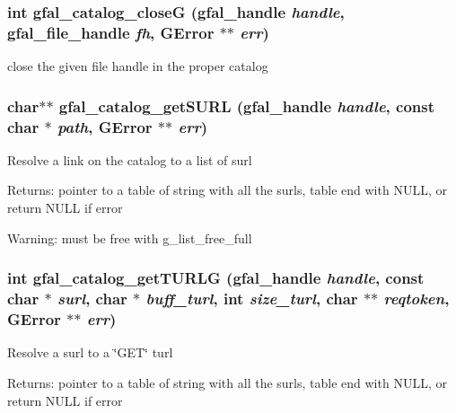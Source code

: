 \subsubsection{\setlength{\rightskip}{0pt plus 5cm}int gfal\_\-catalog\_\-close\-G (gfal\_\-handle {\em handle}, gfal\_\-file\_\-handle {\em fh}, GError $\ast$$\ast$ {\em err})}\label{gfal__common__catalog_8c_27712f4ef0fd4a8d3d5b63b90936d295}


close the given file handle in the proper catalog 
\subsubsection{\setlength{\rightskip}{0pt plus 5cm}char$\ast$$\ast$ gfal\_\-catalog\_\-get\-SURL (gfal\_\-handle {\em handle}, const char $\ast$ {\em path}, GError $\ast$$\ast$ {\em err})}\label{gfal__common__catalog_8c_eeef83dd1c788197ed7ae4a933d8e8d3}


Resolve a link on the catalog to a list of surl \begin{Desc}
\item[Returns:]pointer to a table of string with all the surls, table end with NULL, or return NULL if error \end{Desc}
\begin{Desc}
\item[Warning:]must be free with g\_\-list\_\-free\_\-full \end{Desc}
\subsubsection{\setlength{\rightskip}{0pt plus 5cm}int gfal\_\-catalog\_\-get\-TURLG (gfal\_\-handle {\em handle}, const char $\ast$ {\em surl}, char $\ast$ {\em buff\_\-turl}, int {\em size\_\-turl}, char $\ast$$\ast$ {\em reqtoken}, GError $\ast$$\ast$ {\em err})}\label{gfal__common__catalog_8c_6e670ae4258db2d05c8b5bc1c66f054a}


Resolve a surl to a \char`\"{}GET\char`\"{} turl \begin{Desc}
\item[Returns:]pointer to a table of string with all the surls, table end with NULL, or return NULL if error \end{Desc}
